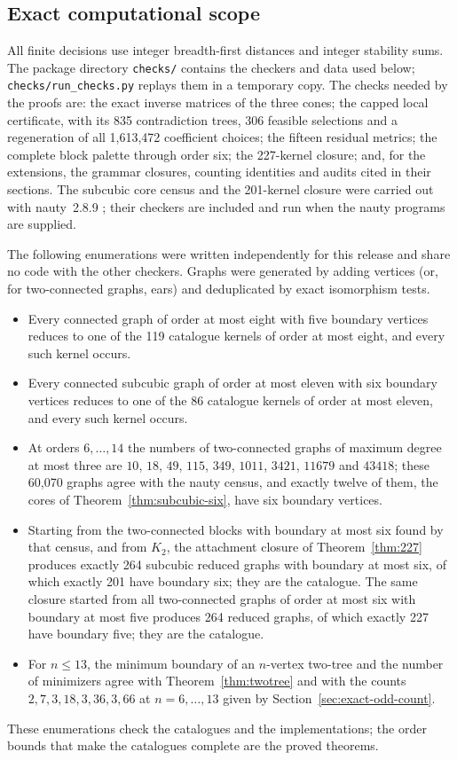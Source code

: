 \documentclass[11pt,a4paper]{article}
\theoremstyle{definition}\newtheorem{definition}[theorem]{Definition}
\theoremstyle{remark}\newtheorem{remark}[theorem]{Remark}
\begin{document}
\subsection{Exact computational scope}
All finite decisions use integer breadth-first distances and integer
stability sums. The package directory \texttt{checks/} contains the
checkers and data used below; \texttt{checks/run\_checks.py} replays them
in a temporary copy. The checks needed by the proofs are: the exact
inverse matrices of the three cones; the capped local certificate, with
its 835 contradiction trees, 306 feasible selections and a regeneration
of all 1,613,472 coefficient choices; the fifteen residual metrics; the
complete block palette through order six; the 227-kernel closure; and,
for the extensions, the grammar closures, counting identities and audits
cited in their sections. The subcubic core census and the 201-kernel
closure were carried out with nauty~2.8.9 \cite{nauty}; their checkers
are included and run when the nauty programs are supplied.

The following enumerations were written independently for this release
and share no code with the other checkers. Graphs were generated by adding
vertices (or, for two-connected graphs, ears) and deduplicated by exact
isomorphism tests.
\begin{itemize}
\item Every connected graph of order at most eight with five boundary
vertices reduces to one of the 119 catalogue kernels of order at most
eight, and every such kernel occurs.
\item Every connected subcubic graph of order at most eleven with six
boundary vertices reduces to one of the 86 catalogue kernels of order at
most eleven, and every such kernel occurs.
\item At orders $6,\dots,14$ the numbers of two-connected graphs of
maximum degree at most three are $10$, $18$, $49$, $115$, $349$, $1011$,
$3421$, $11679$ and $43418$; these
60,070 graphs agree with the nauty census, and exactly twelve of them,
the cores of Theorem~\ref{thm:subcubic-six}, have six boundary vertices.
\item Starting from the two-connected blocks with boundary at most six
found by that census, and from $K_2$, the attachment closure of
Theorem~\ref{thm:227} produces exactly 264 subcubic reduced graphs with
boundary at most six, of which exactly 201 have boundary six; they are
the catalogue. The same closure started from all two-connected graphs of
order at most six with boundary at most five produces 264 reduced graphs,
of which exactly 227 have boundary five; they are the catalogue.
\item For $n\le13$, the minimum boundary of an $n$-vertex two-tree and the
number of minimizers agree with Theorem~\ref{thm:twotree} and with the
counts $2,7,3,18,3,36,3,66$ at $n=6,\dots,13$ given by
Section~\ref{sec:exact-odd-count}.
\end{itemize}
These enumerations check the catalogues and the implementations; the
order bounds that make the catalogues complete are the proved theorems.
\end{document}
